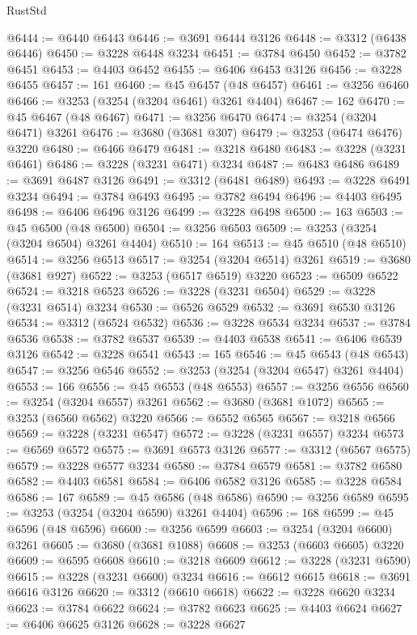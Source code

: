 \begin{lexlean}{RustStd}
\begin{coremodule}
@6444 := @6440 @6443
@6446 := @3691 @6444 @3126
@6448 := @3312 (@6438 @6446)
@6450 := @3228 @6448 @3234
@6451 := @3784 @6450
@6452 := @3782 @6451
@6453 := @4403 @6452
@6455 := @6406 @6453 @3126
@6456 := @3228 @6455
@6457 := 161
@6460 := @45 @6457 (@48 @6457)
@6461 := @3256 @6460
@6466 := @3253 (@3254 (@3204 @6461) @3261 @4404)
@6467 := 162
@6470 := @45 @6467 (@48 @6467)
@6471 := @3256 @6470
@6474 := @3254 (@3204 @6471) @3261
@6476 := @3680 (@3681 @307)
@6479 := @3253 (@6474 @6476) @3220
@6480 := @6466 @6479
@6481 := @3218 @6480
@6483 := @3228 (@3231 @6461)
@6486 := @3228 (@3231 @6471) @3234
@6487 := @6483 @6486
@6489 := @3691 @6487 @3126
@6491 := @3312 (@6481 @6489)
@6493 := @3228 @6491 @3234
@6494 := @3784 @6493
@6495 := @3782 @6494
@6496 := @4403 @6495
@6498 := @6406 @6496 @3126
@6499 := @3228 @6498
@6500 := 163
@6503 := @45 @6500 (@48 @6500)
@6504 := @3256 @6503
@6509 := @3253 (@3254 (@3204 @6504) @3261 @4404)
@6510 := 164
@6513 := @45 @6510 (@48 @6510)
@6514 := @3256 @6513
@6517 := @3254 (@3204 @6514) @3261
@6519 := @3680 (@3681 @927)
@6522 := @3253 (@6517 @6519) @3220
@6523 := @6509 @6522
@6524 := @3218 @6523
@6526 := @3228 (@3231 @6504)
@6529 := @3228 (@3231 @6514) @3234
@6530 := @6526 @6529
@6532 := @3691 @6530 @3126
@6534 := @3312 (@6524 @6532)
@6536 := @3228 @6534 @3234
@6537 := @3784 @6536
@6538 := @3782 @6537
@6539 := @4403 @6538
@6541 := @6406 @6539 @3126
@6542 := @3228 @6541
@6543 := 165
@6546 := @45 @6543 (@48 @6543)
@6547 := @3256 @6546
@6552 := @3253 (@3254 (@3204 @6547) @3261 @4404)
@6553 := 166
@6556 := @45 @6553 (@48 @6553)
@6557 := @3256 @6556
@6560 := @3254 (@3204 @6557) @3261
@6562 := @3680 (@3681 @1072)
@6565 := @3253 (@6560 @6562) @3220
@6566 := @6552 @6565
@6567 := @3218 @6566
@6569 := @3228 (@3231 @6547)
@6572 := @3228 (@3231 @6557) @3234
@6573 := @6569 @6572
@6575 := @3691 @6573 @3126
@6577 := @3312 (@6567 @6575)
@6579 := @3228 @6577 @3234
@6580 := @3784 @6579
@6581 := @3782 @6580
@6582 := @4403 @6581
@6584 := @6406 @6582 @3126
@6585 := @3228 @6584
@6586 := 167
@6589 := @45 @6586 (@48 @6586)
@6590 := @3256 @6589
@6595 := @3253 (@3254 (@3204 @6590) @3261 @4404)
@6596 := 168
@6599 := @45 @6596 (@48 @6596)
@6600 := @3256 @6599
@6603 := @3254 (@3204 @6600) @3261
@6605 := @3680 (@3681 @1088)
@6608 := @3253 (@6603 @6605) @3220
@6609 := @6595 @6608
@6610 := @3218 @6609
@6612 := @3228 (@3231 @6590)
@6615 := @3228 (@3231 @6600) @3234
@6616 := @6612 @6615
@6618 := @3691 @6616 @3126
@6620 := @3312 (@6610 @6618)
@6622 := @3228 @6620 @3234
@6623 := @3784 @6622
@6624 := @3782 @6623
@6625 := @4403 @6624
@6627 := @6406 @6625 @3126
@6628 := @3228 @6627

\end{coremodule}
\end{lexlean}
